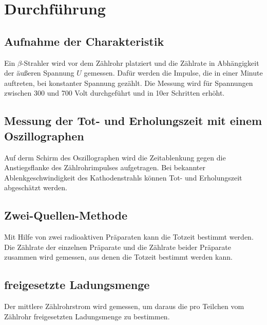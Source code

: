 \section{Durchführung}
\label{sec:Durchführung}

\subsection{Aufnahme der Charakteristik}

Ein $\beta$-Strahler wird vor dem Zählrohr platziert und die Zählrate in Abhängigkeit der äußeren Spannung $U$ gemessen.
Dafür werden die Impulse, die in einer Minute auftreten, bei konstanter Spannung gezählt.
Die Messung wird für Spannungen zwischen 300 und 700 Volt durchgeführt und in 10er Schritten erhöht.

\subsection{Messung der Tot- und Erholungszeit mit einem Oszillographen}

Auf derm Schirm des Oszillographen wird die Zeitablenkung gegen die Anstiegsflanke des Zählrohrimpulses aufgetragen.
Bei bekannter Ablenkgeschwindigkeit des Kathodenstrahls können Tot- und Erholungszeit abgeschätzt werden.

\subsection{Zwei-Quellen-Methode}

Mit Hilfe von zwei radioaktiven Präparaten kann die Totzeit bestimmt werden.
Die Zählrate der einzelnen Präparate und die Zählrate beider Präparate zusammen wird gemessen, aus denen die Totzeit bestimmt werden kann.


\subsection{freigesetzte Ladungsmenge}

Der mittlere Zählrohrstrom wird gemessen, um daraus die pro Teilchen vom Zählrohr freigesetzten Ladungsmenge zu bestimmen.
